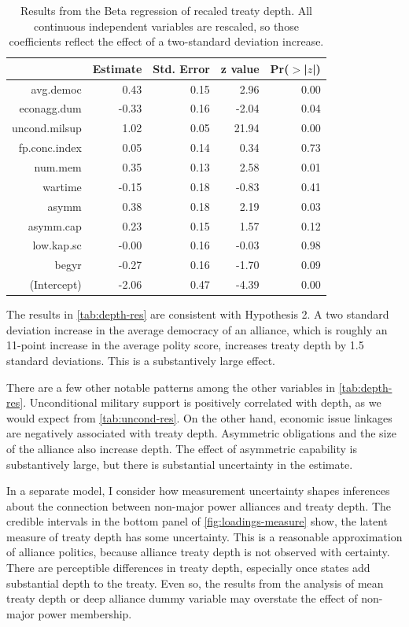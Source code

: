 \documentclass[12pt]{article}
\begin{document}
\begin{table}[ht]
\centering
\begin{tabular}{rrrrr}
  \hline
 & Estimate & Std. Error & z value & Pr($>$|$z$|) \\ 
  \hline 
  avg.democ & 0.43 & 0.15 & 2.96 & 0.00 \\ 
  econagg.dum & -0.33 & 0.16 & -2.04 & 0.04 \\ 
  uncond.milsup & 1.02 & 0.05 & 21.94 & 0.00 \\ 
  fp.conc.index & 0.05 & 0.14 & 0.34 & 0.73 \\ 
  num.mem & 0.35 & 0.13 & 2.58 & 0.01 \\ 
  wartime & -0.15 & 0.18 & -0.83 & 0.41 \\ 
  asymm & 0.38 & 0.18 & 2.19 & 0.03 \\ 
  asymm.cap & 0.23 & 0.15 & 1.57 & 0.12 \\ 
  low.kap.sc & -0.00 & 0.16 & -0.03 & 0.98 \\ 
  begyr & -0.27 & 0.16 & -1.70 & 0.09 \\ 
  (Intercept) & -2.06 & 0.47 & -4.39 & 0.00 \\
   \hline
\end{tabular}
\caption{Results from the Beta regression of recaled treaty depth. All continuous independent variables are rescaled, so those coefficients reflect the effect of a two-standard deviation increase.}
\label{tab:depth-res}
\end{table}


The results in \autoref{tab:depth-res} are consistent with Hypothesis 2. 
A two standard deviation increase in the average democracy of an alliance, which is roughly an 11-point increase in the average polity score, increases treaty depth by 1.5 standard deviations. 
This is a substantively large effect. 


There are a few other notable patterns among the other variables in \autoref{tab:depth-res}. 
Unconditional military support is positively correlated with depth, as we would expect from \autoref{tab:uncond-res}. 
On the other hand, economic issue linkages are negatively associated with treaty depth.
Asymmetric obligations and the size of the alliance also increase depth. 
The effect of asymmetric capability is substantively large, but there is substantial uncertainty in the estimate. 


In a separate model, I consider how measurement uncertainty shapes inferences about the connection between non-major power alliances and treaty depth. 
The credible intervals in the bottom panel of \autoref{fig:loadings-measure} show, the latent measure of treaty depth has some uncertainty. 
This is a reasonable approximation of alliance politics, because alliance treaty depth is not observed with certainty. 
There are perceptible differences in treaty depth, especially once states add substantial depth to the treaty. 
Even so, the results from the analysis of mean treaty depth or deep alliance dummy variable may overstate the effect of non-major power membership. 
\end{document}

